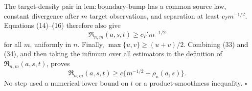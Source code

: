 The target-density pair in \(\mathrm{lem:boundary\text{-}bump}\) has a common source law, constant divergence after \(m\) target observations, and separation at least \(c_Tm^{-1/2}\). Equations (14)--(16) therefore also give
\[
\mathfrak R_{n,m}(a,s,t)\ge c_T'm^{-1/2}
\tag{34}
\]
for all \(m\), uniformly in \(n\). Finally, \(\max\{u,v\}\ge(u+v)/2\). Combining (33) and (34), and then taking the infimum over all estimators in the definition of \(\mathfrak R_{n,m}(a,s,t)\), proves
\[
\mathfrak R_{n,m}(a,s,t)
\ge c\{m^{-1/2}+\rho_n(a,s)\}.
\]
No step used a numerical lower bound on \(t\) or a product-smoothness inequality. \(\square\)